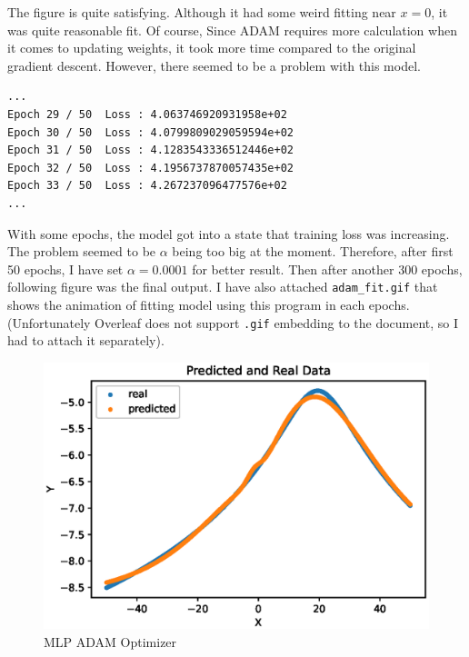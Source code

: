 \documentclass{homework}
\newenvironment{code}{\captionsetup{type=listing}}{}
\begin{document}
The figure is quite satisfying. Although it had some weird fitting near $x=0$, it was quite reasonable fit. Of course, Since ADAM requires more calculation when it comes to updating weights, it took more time compared to the original gradient descent. However, there seemed to be a problem with this model.
\\

\begin{center}
\begin{code}
\begin{verbatim}
...
Epoch 29 / 50  Loss : 4.063746920931958e+02
Epoch 30 / 50  Loss : 4.0799809029059594e+02
Epoch 31 / 50  Loss : 4.1283543336512446e+02
Epoch 32 / 50  Loss : 4.1956737870057435e+02
Epoch 33 / 50  Loss : 4.267237096477576e+02
...
\end{verbatim}
\end{code}
\end{center}

With some epochs, the model got into a state that training loss was increasing. The problem seemed to be $\alpha$ being too big at the moment. Therefore, after first 50 epochs, I have set $\alpha=0.0001$ for better result. Then after another 300 epochs, following figure was the final output. I have also attached \texttt{adam_fit.gif} that shows the animation of fitting model using this program in each epochs. (Unfortunately Overleaf does not support \texttt{.gif} embedding to the document, so I had to attach it separately).

\pagebreak
\begin{figure}[h]
  \centering
  \includegraphics[scale=0.7]{multilayer_adam_new_5.eps}
  \caption{MLP ADAM Optimizer}
\end{figure}
\end{document}
